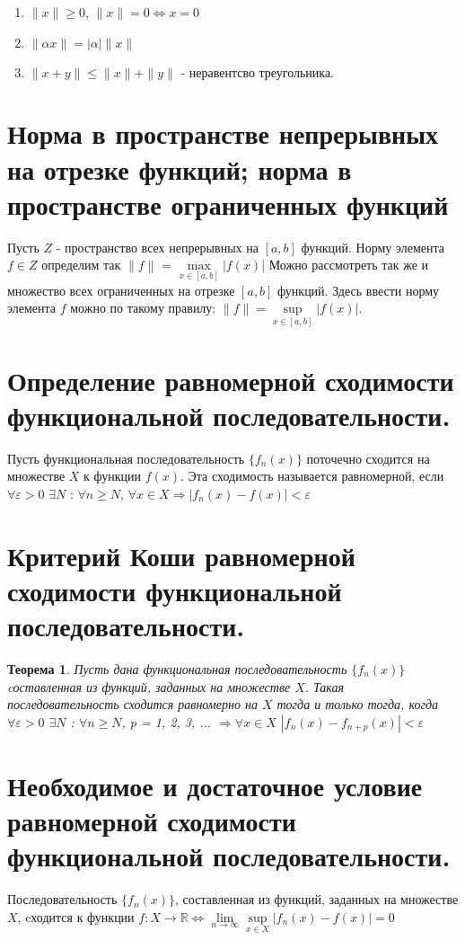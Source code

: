 \documentclass[12pt, a4paper]{article}
\newtheorem{thm}{Теорема}
\begin{document}
\begin{enumerate}
	\item{$\|x\| \geq 0$, $\|x\| = 0 \iff x = 0$}
	\item{$\|\alpha x\| = \mid\alpha\mid\|x\|$}
	\item{$\|x + y\| \leq \|x\| + \|y\|$ - неравентсво треугольника.}
\end{enumerate}


\section{Норма в пространстве непрерывных на отрезке функций; норма в пространстве ограниченных функций}
Пусть $Z$ - пространство всех непрерывных на $[a, b]$ функций. Норму элемента $f \in Z$ определим так $\|f\|$ = 
$\max\limits_{x \in [a, b]}|f(x)|$
\newline
Можно рассмотреть так же и множество всех ограниченных на отрезке $[a, b]$ функций. Здесь ввести норму элемента $f$ можно по такому правилу: $\|f\| = \sup\limits_{x \in[a, b]}|f(x)|$. 


\section{Определение равномерной сходимости функциональной последовательности.}
Пусть функциональная последовательность $\{f_n(x)\}$ поточечно сходится на множестве $X$ к функции $f(x)$. Эта сходимость называется равномерной, если $\forall \varepsilon > 0$ $\exists N$ : $\forall n \geq N$, $\forall x \in X \Longrightarrow |f_n(x) - f(x)| < \varepsilon$


\section{Критерий Коши равномерной сходимости функциональной последовательности.}
\begin{thm}
	Пусть дана функциональная последовательность $\{f_n(x)\}$ cоставленная из функций, заданных на множестве $X$. Такая последовательность сходится равномерно на $X$ тогда и только тогда, когда $\forall \varepsilon > 0$ $\exists N$ : $\forall n \geq N$, p = 1, 2, 3, ... $\Longrightarrow \forall x \in X$ $|f_n(x) - f_{n + p}(x)| < \varepsilon$

\end{thm}


\section{Необходимое и достаточное условие равномерной сходимости функциональной последовательности.}
Последовательность $\{f_n(x)\}$, составленная из функций, заданных на множестве $X$, cходится к функции $f:X \to \mathbb{R} \Longleftrightarrow \lim\limits_{n \to \infty}\sup\limits_{x \in X}|f_n(x) - f(x)| = 0$ 
\end{document}
